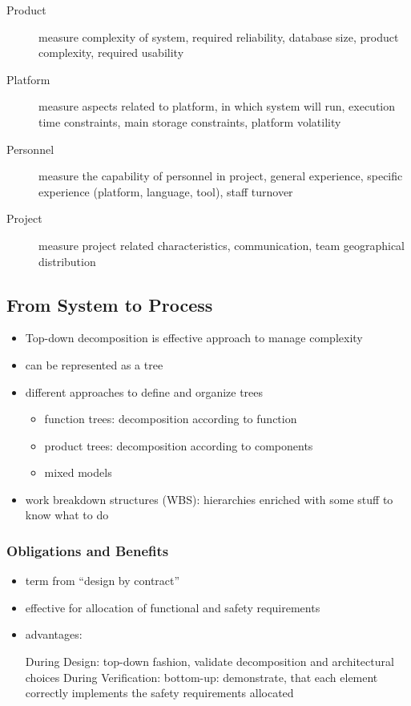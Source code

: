 \documentclass[a4paper, 10pt]{article}
\begin{document}
\begin{itemize}
\begin{itemize}
\begin{itemize}
\begin{description}
                \item[Product] measure complexity of system, required reliability, database size, product complexity, required usability
                \item[Platform] measure aspects related to platform, in which system will run, execution time constraints, main storage constraints, platform volatility
                \item[Personnel] measure the capability of personnel in project, general experience, specific experience (platform, language, tool), staff turnover
                \item[Project] measure project related characteristics, communication, team geographical distribution
            \end{description}
        \end{itemize}
    \end{itemize}
\end{itemize}

\subsection*{From System to Process}
\begin{itemize}
    \item Top-down decomposition is effective approach to manage complexity
    \item can be represented as a tree
    \item different approaches to define and organize trees
    \begin{itemize}
        \item function trees: decomposition according to function
        \item product trees: decomposition according to components
        \item mixed models
    \end{itemize}
    \item work breakdown structures (WBS): hierarchies enriched with some stuff to know what to do
\end{itemize}

\subsubsection*{Obligations and Benefits}
\begin{itemize}
    \item term from ``design by contract''
    \item effective for allocation of functional and safety requirements
    \item advantages:
    \begin{itemize}
        \good During Design: top-down fashion, validate decomposition and architectural choices
        \good During Verification: bottom-up: demonstrate, that each element correctly implements the safety requirements allocated
    \end{itemize}
\end{itemize}
\end{document}
